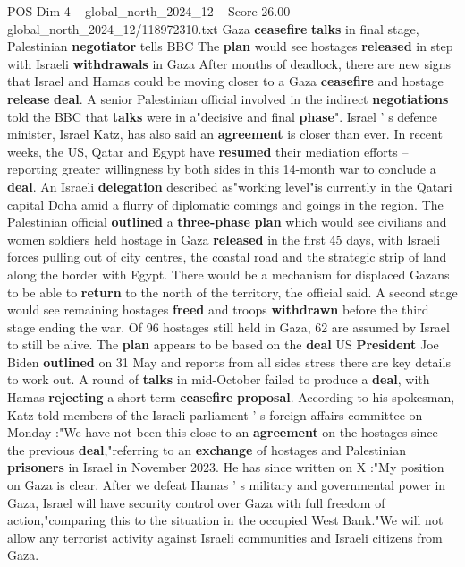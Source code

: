 \begin{textsample}{POS Dim 4 – global\_north\_2024\_12 – Score 26.00 – global\_north\_2024\_12/118972310.txt}  \label{ex:f4_pos_324}
Gaza \textbf{ceasefire} \textbf{talks} in final stage, Palestinian \textbf{negotiator} tells BBC The \textbf{plan} would see hostages \textbf{released} in step with Israeli \textbf{withdrawals} in Gaza After months of deadlock, there are new signs that Israel and Hamas could be moving closer to a Gaza \textbf{ceasefire} and hostage \textbf{release} \textbf{deal}.
A senior Palestinian official involved in the indirect \textbf{negotiations} told the BBC that \textbf{talks} were in a"decisive and final \textbf{phase}".
Israel ' s defence minister, Israel Katz, has also said an \textbf{agreement} is closer than ever.
In recent weeks, the US, Qatar and Egypt have \textbf{resumed} their mediation efforts -- reporting greater willingness by both sides in this 14-month war to conclude a \textbf{deal}.
An Israeli \textbf{delegation} described as"working level"is currently in the Qatari capital Doha amid a flurry of diplomatic comings and goings in the region.
The Palestinian official \textbf{outlined} a \textbf{three-phase} \textbf{plan} which would see civilians and women soldiers held hostage in Gaza \textbf{released} in the first 45 days, with Israeli forces pulling out of city centres, the coastal road and the strategic strip of land along the border with Egypt.
There would be a mechanism for displaced Gazans to be able to \textbf{return} to the north of the territory, the official said.
A second stage would see remaining hostages \textbf{freed} and troops \textbf{withdrawn} before the third stage ending the war.
Of 96 hostages still held in Gaza, 62 are assumed by Israel to still be alive.
The \textbf{plan} appears to be based on the \textbf{deal} US \textbf{President} Joe Biden \textbf{outlined} on 31 May and reports from all sides stress there are key details to work out.
A round of \textbf{talks} in mid-October failed to produce a \textbf{deal}, with Hamas \textbf{rejecting} a short-term \textbf{ceasefire} \textbf{proposal}.
According to his spokesman, Katz told members of the Israeli parliament ' s foreign affairs committee on Monday :"We have not been this close to an \textbf{agreement} on the hostages since the previous \textbf{deal},"referring to an \textbf{exchange} of hostages and Palestinian \textbf{prisoners} in Israel in November 2023.
He has since written on X :"My position on Gaza is clear.
After we defeat Hamas ' s military and governmental power in Gaza, Israel will have security control over Gaza with full freedom of action,"comparing this to the situation in the occupied West Bank."We will not allow any terrorist activity against Israeli communities and Israeli citizens from Gaza.

\end{textsample}
